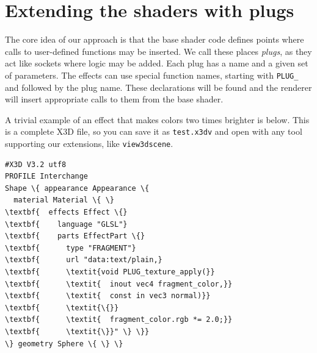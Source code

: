 \documentclass{egpubl}
\begin{document}

%
%

\section{Extending the shaders with plugs}

The core idea of our approach is that the base shader code defines
points where calls to user-defined functions may be inserted. We call
these places \textit{plugs}, as they act like sockets where logic
may be added. Each plug has a name and a given set of parameters.
The effects can use special function names, starting with \texttt{PLUG\_}
and followed by the plug name. These declarations will be found
and the renderer will insert appropriate calls to them from the base shader.

A trivial example of an effect that makes colors two times brighter
is below. This is a complete X3D file, so you can save
it as \texttt{test.x3dv} and open with any tool supporting our
extensions, like \texttt{view3dscene}.

\begin{Verbatim}[commandchars=\\\{\},frame=single,fontsize=\small]
#X3D V3.2 utf8
PROFILE Interchange
Shape \{ appearance Appearance \{
  material Material \{ \}
\textbf{  effects Effect \{}
\textbf{    language "GLSL"}
\textbf{    parts EffectPart \{}
\textbf{      type "FRAGMENT"}
\textbf{      url "data:text/plain,}
\textbf{      \textit{void PLUG_texture_apply(}}
\textbf{      \textit{  inout vec4 fragment_color,}}
\textbf{      \textit{  const in vec3 normal)}}
\textbf{      \textit{\{}}
\textbf{      \textit{  fragment_color.rgb *= 2.0;}}
\textbf{      \textit{\}}" \} \}}
\} geometry Sphere \{ \} \}
\end{Verbatim}
\end{document}
